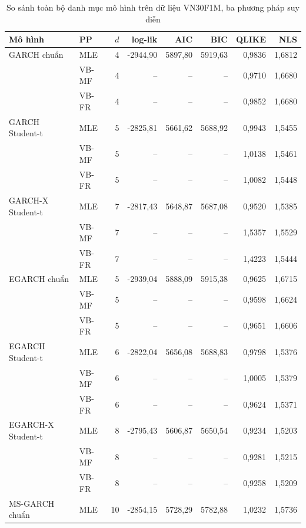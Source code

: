 
\begin{table}[H]
\centering\footnotesize
\caption{So sánh toàn bộ danh mục mô hình trên dữ liệu VN30F1M, ba phương pháp suy diễn}
\label{tab:buoc1-so-sanh}
\begin{tabular}{llrrrrrr}
\toprule
\textbf{Mô hình} & \textbf{PP} & $d$ & log-lik & AIC & BIC & QLIKE & NLS \\
\midrule
GARCH chuẩn & MLE & 4 & -2944,90 & 5897,80 & 5919,63 & 0,9836 & 1,6812 \\
 & VB-MF & 4 & -- & -- & -- & 0,9710 & 1,6680 \\
 & VB-FR & 4 & -- & -- & -- & 0,9852 & 1,6680 \\
GARCH Student-t & MLE & 5 & -2825,81 & 5661,62 & 5688,92 & 0,9943 & 1,5455 \\
 & VB-MF & 5 & -- & -- & -- & 1,0138 & 1,5461 \\
 & VB-FR & 5 & -- & -- & -- & 1,0082 & 1,5448 \\
GARCH-X Student-t & MLE & 7 & -2817,43 & 5648,87 & 5687,08 & 0,9520 & 1,5385 \\
 & VB-MF & 7 & -- & -- & -- & 1,5357 & 1,5529 \\
 & VB-FR & 7 & -- & -- & -- & 1,4223 & 1,5444 \\
EGARCH chuẩn & MLE & 5 & -2939,04 & 5888,09 & 5915,38 & 0,9625 & 1,6715 \\
 & VB-MF & 5 & -- & -- & -- & 0,9598 & 1,6624 \\
 & VB-FR & 5 & -- & -- & -- & 0,9651 & 1,6606 \\
EGARCH Student-t & MLE & 6 & -2822,04 & 5656,08 & 5688,83 & 0,9798 & 1,5376 \\
 & VB-MF & 6 & -- & -- & -- & 1,0005 & 1,5379 \\
 & VB-FR & 6 & -- & -- & -- & 0,9624 & 1,5371 \\
EGARCH-X Student-t & MLE & 8 & -2795,43 & 5606,87 & 5650,54 & 0,9234 & 1,5203 \\
 & VB-MF & 8 & -- & -- & -- & 0,9281 & 1,5215 \\
 & VB-FR & 8 & -- & -- & -- & 0,9258 & 1,5209 \\
MS-GARCH chuẩn & MLE & 10 & -2854,15 & 5728,29 & 5782,88 & 1,0232 & 1,5736 \\

\end{tabular}
\end{table}
